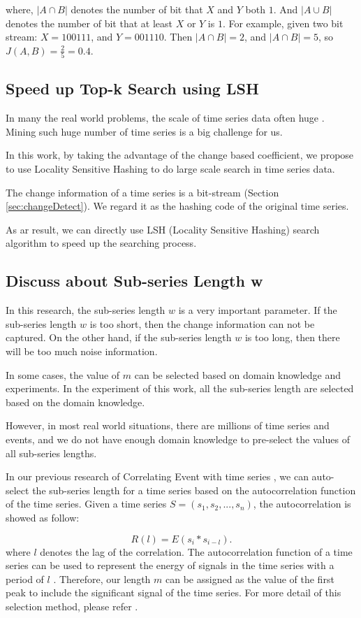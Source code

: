 where, $|A \cap B|$ denotes the number of bit that $X$ and $Y$ both $1$. And $|A \cup B|$ denotes the number of bit that at least $X$ or $Y$ is $1$.
For example, given two bit stream: $X={100111}$, and $Y={001110}$. Then $|A \cap B| = 2$, and $|A \cap B| = 5$, so $J(A,B) = \frac{2}{5} = 0.4$.


\subsection{Speed up Top-k Search using LSH}

In many the real world problems, the scale of time series data often huge \cite{rakthanmanon2012searching}. Mining such huge number of time series is a big challenge for us.

In this work, by taking the advantage of the change based coefficient, we propose to use Locality Sensitive Hashing to do large scale search in time series data.

The change information of a time series is a bit-stream (Section \ref{sec:changeDetect}). We regard it as the hashing code of the original time series.

As ar result, we can directly use LSH (Locality Sensitive Hashing) search algorithm to speed up the searching process. \cite{indyk1998approximate} 

\subsection{Discuss about Sub-series Length w}

In this research, the sub-series length $w$ is a very important parameter.
If the sub-series length $w$ is too short, then the change information can not be captured. 
On the other hand, if the sub-series length $w$ is too long, then there will be too much noise information.

In some cases, the value of $m$ can be selected based on domain knowledge and experiments. In the experiment of this work, all the sub-series length are selected based on the domain knowledge.

However, in most real world situations, there are millions of time series and events, and we do not have enough domain knowledge to pre-select the values of all sub-series lengths. 

In our previous research of Correlating Event with time series \cite{luo2014correlating}, we can auto-select the sub-series length for a time series based on the autocorrelation function \cite{hamilton1994time} of the time series.
Given a time series $S=(s_1,s_2,...,s_n)$, the autocorrelation is showed as follow:

\begin{equation}
R(l) = E(s_i*s_{i-l}).
\end{equation}
where $l$ denotes the lag of the correlation. The autocorrelation function of a time series can be used to represent the energy of signals in the time series with a period of $l$ \cite{hamilton1994time}. Therefore, our length $m$ can be assigned as the value of the first peak to include the significant signal of the time series. For more detail of this selection method, please refer \cite{luo2014correlating}.
